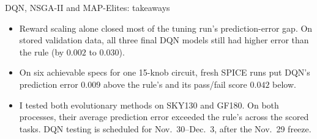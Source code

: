 \begin{frame}{DQN, NSGA-II and MAP-Elites: takeaways}
  \begin{itemize}
    \item Reward scaling alone closed most of the tuning run's prediction-error gap. On stored validation data, all three final DQN models still had higher error than the rule (by $0.002$ to $0.030$).
    \item On six achievable specs for one 15-knob circuit, fresh SPICE runs put DQN's prediction error $0.009$ above the rule's and its pass/fail score $0.042$ below.
    \item I tested both evolutionary methods on SKY130 and GF180. On both processes, their average prediction error exceeded the rule's across the scored tasks. DQN testing is scheduled for Nov.\ 30--Dec.\ 3, after the Nov.\ 29 freeze.
  \end{itemize}
\end{frame}
